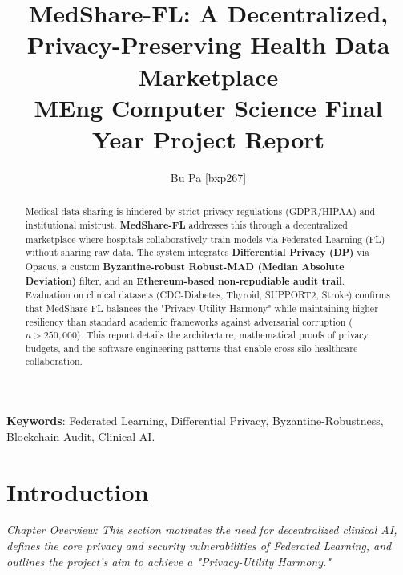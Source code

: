 \documentclass[10pt, a4paper, twocolumn]{article}
\title{\textbf{MedShare-FL: A Decentralized, Privacy-Preserving Health Data Marketplace} \\ \Large MEng Computer Science Final Year Project Report}
\author{Bu Pa [bxp267]}
\date{}
\begin{document}
\maketitle

\begin{abstract}
Medical data sharing is hindered by strict privacy regulations (GDPR/HIPAA) and institutional mistrust. \textbf{MedShare-FL} addresses this through a decentralized marketplace where hospitals collaboratively train models via Federated Learning (FL) without sharing raw data. The system integrates \textbf{Differential Privacy (DP)} via Opacus, a custom \textbf{Byzantine-robust Robust-MAD (Median Absolute Deviation)} filter, and an \textbf{Ethereum-based non-repudiable audit trail}. Evaluation on clinical datasets (CDC-Diabetes, Thyroid, SUPPORT2, Stroke) confirms that MedShare-FL balances the "Privacy-Utility Harmony" while maintaining higher resiliency than standard academic frameworks against adversarial corruption ($n > 250,000$). This report details the architecture, mathematical proofs of privacy budgets, and the software engineering patterns that enable cross-silo healthcare collaboration.
\end{abstract}

\textbf{Keywords}: Federated Learning, Differential Privacy, Byzantine-Robustness, Blockchain Audit, Clinical AI.

\vspace{0.5cm}
\begin{center}
\end{center}
\vspace{0.5cm}

\section{Introduction}

\textit{Chapter Overview: This section motivates the need for decentralized clinical AI, defines the core privacy and security vulnerabilities of Federated Learning, and outlines the project's aim to achieve a "Privacy-Utility Harmony."}
\end{document}
